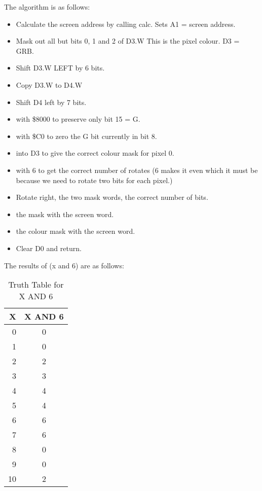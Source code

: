The algorithm is as follows:
\begin{itemize}[itemsep=0pt]

\item{}Calculate the screen address by calling calc. Sets A1 = screen
        address.


\item{}Mask out all but bits 0, 1 and 2 of D3.W This is the pixel
        colour. D3 = GRB.


\item{}Shift D3.W LEFT by 6 bits.


\item{}Copy D3.W to D4.W


\item{}Shift D4 left by 7 bits.


\item{} with \$8000 to preserve only bit 15 = G.


\item{} with \$C0 to zero the G bit currently in bit
        8.


\item{} into D3 to give the correct colour mask for pixel
        0.


\item{} with 6 to get the correct number of rotates (6 makes
        it even which it must be because we need to rotate two bits for each
        pixel.)


\item{}Rotate right, the two mask words, the correct number of
        bits.


\item{} the mask with the screen word.


\item{} the colour mask with the screen word.


\item{}Clear D0 and return.

\end{itemize}

The results of (x and 6) are as follows:


\begin{table}[htbp]
\centering
\begin{tabular}{r c}
\toprule
\textbf{X} & \textbf{X AND 6} \\
\midrule
%
0 & 0 \\
1 & 0 \\
2 & 2 \\
3 & 3 \\
4 & 4 \\
5 & 4 \\
6 & 6 \\
7 & 6 \\
8 & 0 \\
9 & 0 \\
10 & 2  \\
%
\bottomrule
\end{tabular}
\caption{Truth Table for X AND 6}
\label{tab:TruthTableForXAnd6}
\end{table}

